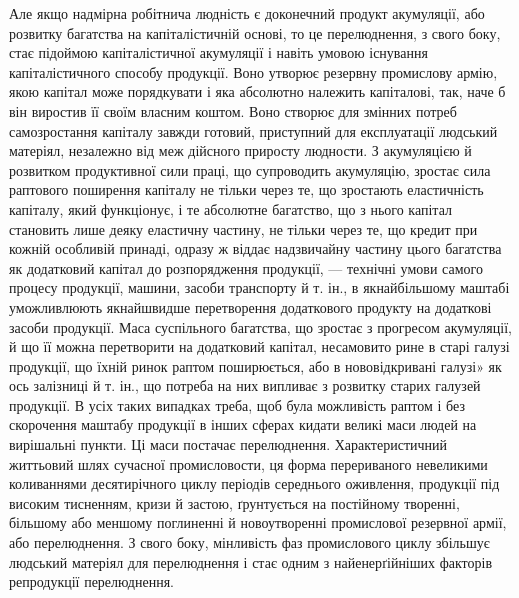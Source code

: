 Але якщо надмірна робітнича людність є доконечний продукт
акумуляції, або розвитку багатства на капіталістичній основі,
то це перелюднення, з свого боку, стає підоймою капіталістичної
акумуляції і навіть умовою існування капіталістичного способу
продукції. Воно утворює резервну промислову армію, якою капітал
може порядкувати і яка абсолютно належить капіталові,
так, наче б він виростив її своїм власним коштом. Воно створює
для змінних потреб самозростання капіталу завжди готовий,
приступний для експлуатації людський матеріял, незалежно
від меж дійсного приросту людности. З акумуляцією й розвитком
продуктивної сили праці, що супроводить акумуляцію,
зростає сила раптового поширення капіталу не тільки через те,
що зростають еластичність капіталу, який функціонує, і те абсолютне
багатство, що з нього капітал становить лише деяку
еластичну частину, не тільки через те, що кредит при кожній
особливій принаді, одразу ж віддає надзвичайну частину цього
багатства як додатковий капітал до розпорядження продукції,
— технічні умови самого процесу продукції, машини, засоби
транспорту й т. ін., в якнайбільшому маштабі уможливлюють
якнайшвидше перетворення додаткового продукту на
додаткові засоби продукції. Маса суспільного багатства, що зростає
з прогресом акумуляції, й що її можна перетворити на додатковий
капітал, несамовито рине в старі галузі продукції, що
їхній ринок раптом поширюється, або в нововідкривані галузі»
як ось залізниці й т. ін., що потреба на них випливає з розвитку
старих галузей продукції. В усіх таких випадках треба, щоб була
можливість раптом і без скорочення маштабу продукції в інших
сферах кидати великі маси людей на вирішальні пункти. Ці
маси постачає перелюднення. Характеристичний життьовий шлях
сучасної промисловости, ця форма перериваного невеликими
коливаннями десятирічного циклу періодів середнього оживлення,
продукції під високим тисненням, кризи й застою, ґрунтується
на постійному творенні, більшому або меншому поглиненні й
новоутворенні промислової резервної армії, або перелюднення.
З свого боку, мінливість фаз промислового циклу збільшує
людський матеріял для перелюднення і стає одним з найенерґійніших
факторів репродукції перелюднення.

